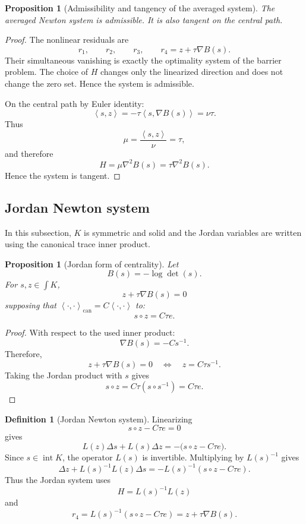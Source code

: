 \documentclass[a4paper,11pt]{book}
\theoremstyle{plain}
\newtheorem{proposition}[theorem]{Proposition}
\theoremstyle{definition}
\newtheorem{definition}[theorem]{Definition}
\theoremstyle{remark}
\numberwithin{equation}{chapter}
\numberwithin{algorithm}{chapter}
\newcommand{\inner}[2]{\left\langle #1, #2 \right\rangle}
\newcommand{\intr}{\operatorname{int}}
\begin{document}
	\begin{proposition}[Admissibility and tangency of the averaged system]
		The averaged Newton system is admissible. It is also tangent on the central
		path.
	\end{proposition}
	
	\begin{proof}
		The nonlinear residuals are
		\[
		r_1,\qquad r_2,\qquad r_3,\qquad
		r_4=z+\tau\nabla B(s).
		\]
		Their simultaneous vanishing is exactly the optimality system of the barrier
		problem. The choice of \(H\) changes only the linearized direction and does
		not change the zero set. Hence the system is admissible.
		
		On the central path by Euler identity:
		\[
		\inner{s}{z}
		=
		-\tau\inner{s}{\nabla B(s)}
		=
		\nu\tau.
		\]
		Thus
		\[
		\mu=\frac{\inner{s}{z}}{\nu}=\tau,
		\]
		and therefore
		\[
		H
		=
		\mu\nabla^2B(s)
		=
		\tau\nabla^2B(s).
		\]
		Hence the system is tangent.
	\end{proof}
	
	\subsection{Jordan Newton system}
	
	In this subsection, \(K\)  is symmetric and solid and the Jordan variables are written
	using the canonical trace inner product.
	
	\begin{proposition}[Jordan form of centrality]
		Let
		\[
		B(s)=-\log\det(s).
		\]
		For \(s,z\in\int K\),
		\[
		z+\tau\nabla B(s)=0
		\]
		supposing that $\inner{\cdot}{\cdot}_{\mathrm{can}}=C\inner{\cdot}{\cdot}$ to: 
		\begin{equation}
			s\circ z=C\tau e.
			\label{eq:jordan-centrality}
		\end{equation}
	\end{proposition}
	
	
	\begin{proof}
		With respect to the  used inner product:
		\[
		\nabla B(s)=-Cs^{-1}.
		\]
		Therefore,
		\[
		z+\tau\nabla B(s)=0
		\quad\Longleftrightarrow\quad
		z=C\tau s^{-1}.
		\]
		Taking the Jordan product with \(s\) gives
		\[
		s\circ z
		=
		C\tau(s\circ s^{-1})
		=
		C\tau e.
		\]
	\end{proof}
	
	\begin{definition}[Jordan Newton system]
		Linearizing
		\[
		s\circ z-C\tau e=0
		\]
		gives
		\[
		L(z)\Delta s+L(s)\Delta z
		=
		-\bigl(s\circ z-C\tau e\bigr).
		\]
		Since \(s\in\intr K\), the operator \(L(s)\) is invertible. Multiplying by
		\(L(s)^{-1}\) gives
		\[
		\Delta z+L(s)^{-1}L(z)\Delta s
		=
		-L(s)^{-1}(s\circ z-C\tau e).
		\]
		Thus the Jordan system uses
		\begin{equation}
			H=L(s)^{-1}L(z)
		\end{equation}
		and
		\begin{equation}
			r_4
			=
			L(s)^{-1}(s\circ z-C\tau e)
			=
			z+\tau\nabla B(s).
		\end{equation}
	\end{definition}
	
\end{document}
